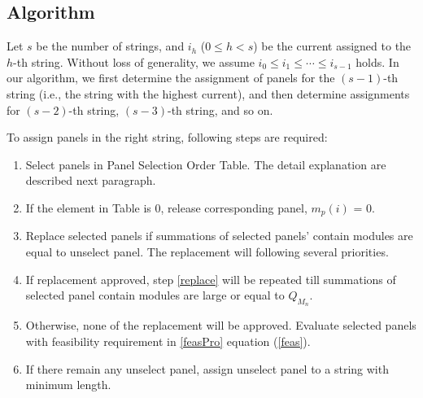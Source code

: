 \documentclass[conference]{IEEEtran}
\begin{document}
\subsection{Algorithm} \label{selection strategy}
Let $s$ be the number of strings, and $i_h$ ($0\le h<s$) be the current assigned to the $h$-th string. Without loss of generality, we assume $i_0\le i_1\le \cdots \le i_{s-1}$ holds. In our algorithm, we first determine the assignment of panels for the $(s-1)$-th string (i.e., the string with the highest current), and then determine assignments for $(s-2)$-th string, $(s-3)$-th string, and so on.

To assign panels in the right string, following steps are required:
\begin{enumerate} [(1)]
\item Select panels in Panel Selection Order Table. The detail explanation are described next paragraph.\label{step1}
\item If the element in Table is 0, release corresponding panel, $m_p(i)$ = 0.
\item Replace selected panels if summations of selected panels' contain modules are equal to unselect panel. The replacement will following several priorities.
  \label{replace}
\item If replacement approved, step \ref{replace} will be repeated till summations of selected panel contain modules are large or equal to \textit{$Q_{M_n}$}.
\item Otherwise, none of the replacement will be approved. Evaluate selected panels with feasibility requirement in \ref{feasPro} equation (\ref{feas}).
\item If there remain any unselect panel, assign unselect panel to a string with minimum length. 
\end{enumerate}
\vspace{5.7cm}
\end{document}

